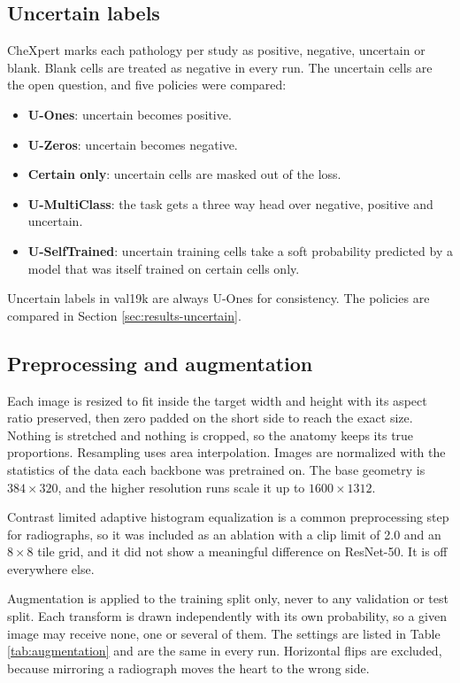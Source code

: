 \documentclass{article}
\begin{document}
\subsection{Uncertain labels}
\label{sec:uncertain}

CheXpert marks each pathology per study as positive, negative, uncertain or blank.
Blank cells are treated as negative in every run. The uncertain cells are the open
question, and five policies were compared:

\begin{itemize}
  \item \textbf{U-Ones}: uncertain becomes positive.
  \item \textbf{U-Zeros}: uncertain becomes negative.
  \item \textbf{Certain only}: uncertain cells are masked out of the loss.
  \item \textbf{U-MultiClass}: the task gets a three way head over negative,
        positive and uncertain.
  \item \textbf{U-SelfTrained}: uncertain training cells take a soft probability
        predicted by a model that was itself trained on certain cells only.
\end{itemize}

Uncertain labels in val19k are always U-Ones for consistency.
The policies are compared in Section \ref{sec:results-uncertain}.

\subsection{Preprocessing and augmentation}

Each image is resized to fit inside the target width and height with its aspect ratio
preserved, then zero padded on the short side to reach the exact size. Nothing is
stretched and nothing is cropped, so the anatomy keeps its true proportions.
Resampling uses area interpolation. Images are normalized with the statistics of the
data each backbone was pretrained on. The base geometry is $384\times320$, and the higher resolution runs
scale it up to $1600\times1312$.

Contrast limited adaptive histogram equalization is a common preprocessing step for
radiographs, so it was included as an ablation with a clip limit of 2.0 and an
$8\times8$ tile grid, and it did not show a meaningful difference on ResNet-50. It is
off everywhere else.

Augmentation is applied to the training split only, never to any validation or test
split. Each transform is drawn independently with its own probability, so a given
image may receive none, one or several of them. The settings are listed in
Table \ref{tab:augmentation} and are the same in every run. Horizontal flips are
excluded, because mirroring a radiograph moves the heart to the wrong side.
\end{document}
